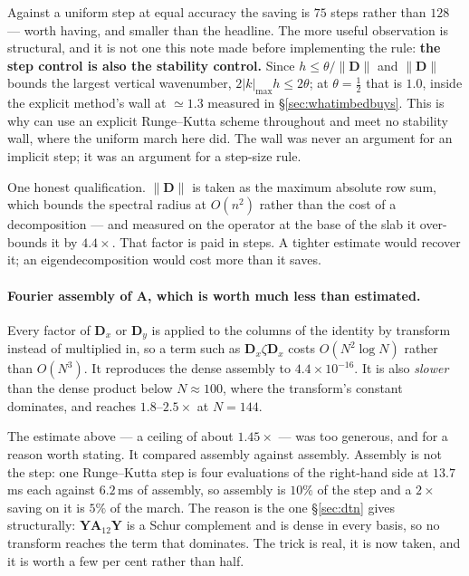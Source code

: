\documentclass[11pt,a4paper]{article}
\newcommand{\bA}{\mathbf{A}}
\newcommand{\bY}{\mathbf{Y}}
\begin{document}
\noindent
Against a uniform step at equal accuracy the saving is $75$ steps rather than
$128$ --- worth having, and smaller than the headline.  The more useful
observation is structural, and it is not one this note made before implementing
the rule: \textbf{the step control is also the stability control.}  Since
$h \le \theta/\|\mathbf{D}\|$ and $\|\mathbf{D}\|$ bounds the largest vertical
wavenumber, $2|k|_{\max}h \le 2\theta$; at $\theta=\tfrac12$ that is $1.0$,
inside the explicit method's wall at $\simeq1.3$ measured in
\S\ref{sec:whatimbedbuys}.  This is why \cite{haines2004} can use an explicit
Runge--Kutta scheme throughout and meet no stability wall, where the uniform
march here did.  The wall was never an argument for an implicit step; it was an
argument for a step-size rule.

One honest qualification.  $\|\mathbf{D}\|$ is taken as the maximum absolute row
sum, which bounds the spectral radius at $O(n^2)$ rather than the cost of a
decomposition --- and measured on the operator at the base of the slab it
over-bounds it by $4.4\times$.  That factor is paid in steps.  A tighter
estimate would recover it; an eigendecomposition would cost more than it saves.

\paragraph{Fourier assembly of $\bA$, which is worth much less than estimated.}
Every factor of $\mathbf{D}_x$ or $\mathbf{D}_y$ is applied to the columns of
the identity by transform instead of multiplied in, so a term such as
$\mathbf{D}_x\zeta\mathbf{D}_x$ costs $O(N^{2}\log N)$ rather than $O(N^{3})$.
It reproduces the dense assembly to $4.4\times10^{-16}$.  It is also
\emph{slower} than the dense product below $N\approx100$, where the transform's
constant dominates, and reaches $1.8$--$2.5\times$ at $N=144$.

The estimate above --- a ceiling of about $1.45\times$ --- was too generous, and
for a reason worth stating.  It compared assembly against assembly.  Assembly is
not the step: one Runge--Kutta step is four evaluations of the right-hand side
at $13.7$\,ms each against $6.2$\,ms of assembly, so assembly is $10\%$ of the
step and a $2\times$ saving on it is $5\%$ of the march.  The reason is the one
\S\ref{sec:dtn} gives structurally: $\bY\bA_{12}\bY$ is a Schur complement and
is dense in every basis, so no transform reaches the term that dominates.  The
trick is real, it is now taken, and it is worth a few per cent rather than half.
\end{document}

